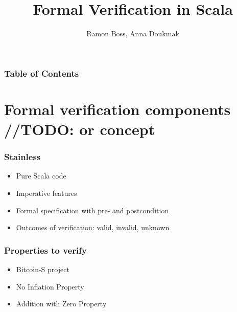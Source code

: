 \documentclass{beamer}
\begin{document}
\title{Formal Verification in Scala}
\author{Ramon Boss, Anna Doukmak}

\frame{\titlepage}

\begin{frame}
  \frametitle{Table of Contents}
  \tableofcontents
\end{frame}

\section{Formal verification components //TODO: or concept}

\begin{frame}
\frametitle{Stainless}
  \begin{itemize}
    \item Pure Scala code
    \item Imperative features
    \item Formal specification with pre- and postcondition
    \item Outcomes of verification: valid, invalid, unknown
  \end{itemize}
\end{frame}


\begin{frame}
\frametitle{Properties to verify}
\begin{itemize}
  \item Bitcoin-S project
  \item No Inflation Property
  \item Addition with Zero Property
\end{itemize}

\end{frame}
\end{document}
